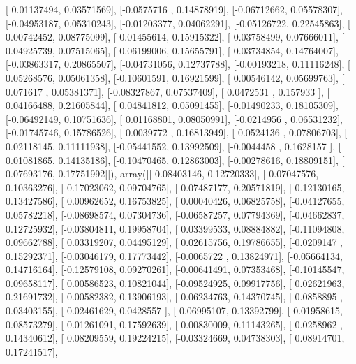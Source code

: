 \documentclass{article}
\begin{document}
       [ 0.01137494,  0.03571569],
       [-0.0575716 ,  0.14878919],
       [-0.06712662,  0.05578307],
       [-0.04953187,  0.05310243],
       [-0.01203377,  0.04062291],
       [-0.05126722,  0.22545863],
       [ 0.00742452,  0.08775099],
       [-0.01455614,  0.15915322],
       [-0.03758499,  0.07666011],
       [ 0.04925739,  0.07515065],
       [-0.06199006,  0.15655791],
       [-0.03734854,  0.14764007],
       [-0.03863317,  0.20865507],
       [-0.04731056,  0.12737788],
       [-0.00193218,  0.11116248],
       [ 0.05268576,  0.05061358],
       [-0.10601591,  0.16921599],
       [ 0.00546142,  0.05699763],
       [ 0.071617  ,  0.05381371],
       [-0.08327867,  0.07537409],
       [ 0.0472531 ,  0.157933  ],
       [ 0.04166488,  0.21605844],
       [ 0.04841812,  0.05091455],
       [-0.01490233,  0.18105309],
       [-0.06492149,  0.10751636],
       [ 0.01168801,  0.08050991],
       [-0.0214956 ,  0.06531232],
       [-0.01745746,  0.15786526],
       [ 0.0039772 ,  0.16813949],
       [ 0.0524136 ,  0.07806703],
       [ 0.02118145,  0.11111938],
       [-0.05441552,  0.13992509],
       [-0.0044458 ,  0.1628157 ],
       [ 0.01081865,  0.14135186],
       [-0.10470465,  0.12863003],
       [-0.00278616,  0.18809151],
       [ 0.07693176,  0.17751992]]), array([[-0.08403146,  0.12720333],
       [-0.07047576,  0.10363276],
       [-0.17023062,  0.09704765],
       [-0.07487177,  0.20571819],
       [-0.12130165,  0.13427586],
       [ 0.00962652,  0.16753825],
       [ 0.00040426,  0.06825758],
       [-0.04127655,  0.05782218],
       [-0.08698574,  0.07304736],
       [-0.06587257,  0.07794369],
       [-0.04662837,  0.12725932],
       [-0.03804811,  0.19958704],
       [ 0.03399533,  0.08884882],
       [-0.11094808,  0.09662788],
       [ 0.03319207,  0.04495129],
       [ 0.02615756,  0.19786655],
       [-0.0209147 ,  0.15292371],
       [-0.03046179,  0.17773442],
       [-0.0065722 ,  0.13824971],
       [-0.05664134,  0.14716164],
       [-0.12579108,  0.09270261],
       [-0.00641491,  0.07353468],
       [-0.10145547,  0.09658117],
       [ 0.00586523,  0.10821044],
       [-0.09524925,  0.09917756],
       [ 0.02621963,  0.21691732],
       [ 0.00582382,  0.13906193],
       [-0.06234763,  0.14370745],
       [ 0.0858895 ,  0.03403155],
       [ 0.02461629,  0.0428557 ],
       [ 0.06995107,  0.13392799],
       [ 0.01958615,  0.08573279],
       [-0.01261091,  0.17592639],
       [-0.00830009,  0.11143265],
       [-0.0258962 ,  0.14340612],
       [ 0.08209559,  0.19224215],
       [-0.03324669,  0.04738303],
       [ 0.08914701,  0.17241517],
\end{document}
